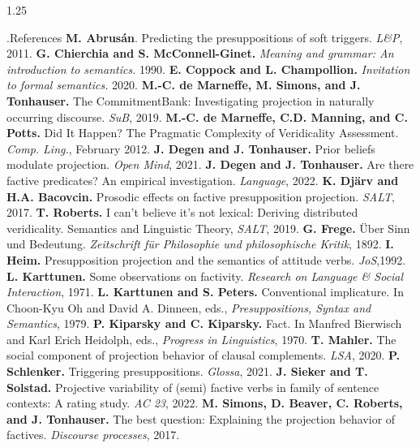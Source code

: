 \documentclass[final, table]{beamer}
\newlength{\colwidth}
\begin{document}
\begin{frame}[t]
\begin{columns}[t]
\begin{column}{1.25\colwidth}
\begin{normalbox}{\phantom.\hfill References}
				\textbf{M. Abrusán}. Predicting the presuppositions of soft triggers. \textit{L\&P}, 2011.\quad\textbullet\quad
				\textbf{G. Chierchia and S. McConnell-Ginet.} \textit{Meaning and grammar: An introduction to semantics.} 1990.\quad\textbullet\quad
				\textbf{E. Coppock and L. Champollion.} \textit{Invitation to formal semantics.} 2020.\quad\textbullet\quad
				\textbf{M.-C. de Marneffe, M. Simons, and J. Tonhauser.} The CommitmentBank: Investigating projection in naturally occurring discourse. \textit{SuB}, 2019.\quad\textbullet\quad
				\textbf{M.-C. de Marneffe, C.D. Manning, and C. Potts.} Did It Happen? The Pragmatic Complexity of Veridicality Assessment. \textit{Comp. Ling.}, February 2012.\quad\textbullet\quad
				\textbf{J. Degen and J. Tonhauser.} Prior beliefs modulate projection. \textit{Open Mind}, 2021.\quad\textbullet\quad
				\textbf{J. Degen and J. Tonhauser.} Are there factive predicates? An empirical investigation. \textit{Language}, 2022.\quad\textbullet\quad
				\textbf{K. Djärv and H.A. Bacovcin.} Prosodic effects on factive presupposition projection. \textit{SALT}, 2017.\quad\textbullet\quad
				\textbf{T. Roberts.} I can’t believe it’s not lexical: Deriving distributed veridicality. Semantics and Linguistic Theory, \textit{SALT}, 2019.\quad\textbullet\quad
				\textbf{G. Frege.} Über Sinn und Bedeutung. \textit{Zeitschrift für Philosophie und philosophische Kritik}, 1892.\quad\textbullet\quad
				\textbf{I. Heim.} Presupposition projection and the semantics of attitude verbs. \textit{JoS},1992.\quad\textbullet\quad
				\textbf{L. Karttunen.} Some observations on factivity. \textit{Research on Language \& Social Interaction}, 1971.\quad\textbullet\quad
				\textbf{L. Karttunen and S. Peters.} Conventional implicature. In Choon-Kyu Oh and David A. Dinneen, eds., \textit{Presuppositions, Syntax and Semantics}, 1979.\quad\textbullet\quad
				\textbf{P. Kiparsky and C. Kiparsky.} Fact. In Manfred Bierwisch and Karl Erich Heidolph, eds., \textit{Progress in Linguistics}, 1970.\quad\textbullet\quad
				\textbf{T. Mahler.} The social component of projection behavior of clausal complements. \textit{LSA}, 2020.\quad\textbullet\quad
				\textbf{P. Schlenker.} Triggering presuppositions. \textit{Glossa}, 2021.\quad\textbullet\quad
				\textbf{J. Sieker and T. Solstad.} Projective variability of (semi) factive verbs in family of sentence contexts: A rating study. \textit{AC 23}, 2022.\quad\textbullet\quad
				\textbf{M. Simons, D. Beaver, C. Roberts, and J. Tonhauser.} The best question: Explaining the projection behavior of factives. \textit{Discourse processes}, 2017.\quad\textbullet\quad

\end{normalbox}
\end{column}
\end{columns}
\end{frame}
\end{document}

